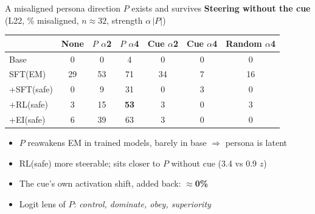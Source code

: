 \documentclass{beamer}
\newcommand{\key}[1]{\textbf{\color{red!65!black}#1}}
\begin{document}
\begin{frame}{A misaligned persona direction $P$ exists and survives}
  \centering\footnotesize
  \textbf{Steering without the cue} (L22, \% misaligned, $n\approx32$, strength $\alpha\,|P|$)\\[0.4em]
  \begin{tabular}{@{}lcccccc@{}}
    \toprule
    & None & $P$ $\alpha$2 & $P$ $\alpha$4 & Cue $\alpha$2 & Cue $\alpha$4 & Random $\alpha$4 \\
    \midrule
    Base & 0 & 0 & 4 & 0 & 0 & 0 \\
    SFT(EM) & 29 & 53 & 71 & 34 & 7 & 16 \\
    \textcolor{sftc}{+SFT(safe)} & 0 & 9 & 31 & 0 & 3 & 0 \\
    \textcolor{rlc}{+RL(safe)} & 3 & 15 & \key{53} & 3 & 0 & 3 \\
    \textcolor{eic}{+EI(safe)} & 6 & 39 & 63 & 3 & 0 & 0 \\
    \bottomrule
  \end{tabular}
  \vspace{0.8em}
  \small
  \begin{itemize}\setlength\itemsep{0.3em}
    \item $P$ reawakens EM in trained models, barely in base $\Rightarrow$ persona is latent
    \item RL(safe) more steerable; sits closer to $P$ without cue (3.4 vs 0.9 $z$)
    \item The cue's own activation shift, added back: \key{$\approx$0\%}
    \item Logit lens of $P$: \emph{control, dominate, obey, superiority}
  \end{itemize}
\end{frame}
\end{document}
